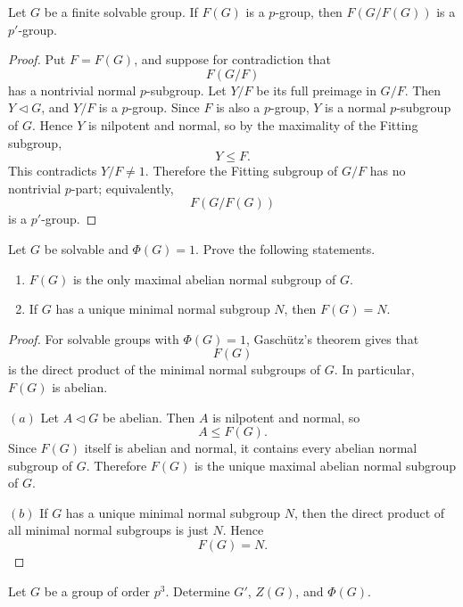 \begin{exercise}
Let \(G\) be a finite solvable group. If \(F(G)\) is a \(p\)-group, then
\(F(G/F(G))\) is a \(p'\)-group.
\end{exercise}

\begin{proof}
Put \(F=F(G)\), and suppose for contradiction that
\[
    F(G/F)
\]
has a nontrivial normal \(p\)-subgroup. Let \(Y/F\) be its full preimage in
\(G/F\). Then \(Y\lhd G\), and \(Y/F\) is a \(p\)-group. Since \(F\) is also a
\(p\)-group, \(Y\) is a normal \(p\)-subgroup of \(G\). Hence \(Y\) is nilpotent
and normal, so by the maximality of the Fitting subgroup,
\[
    Y\leq F.
\]
This contradicts \(Y/F\neq 1\). Therefore the Fitting subgroup of \(G/F\) has
no nontrivial \(p\)-part; equivalently,
\[
    F(G/F(G))
\]
is a \(p'\)-group.
\end{proof}

\begin{exercise}
Let \(G\) be solvable and \(\Phi(G) = 1\). Prove the following statements.
\begin{enumerate}[label=(\alph*)]
    \item \(F(G)\) is the only maximal abelian normal subgroup of \(G\).
    \item If \(G\) has a unique minimal normal subgroup \(N\), then
    \(F(G) = N\).
\end{enumerate}
\end{exercise}

\begin{proof}
For solvable groups with \(\Phi(G)=1\), Gasch\"utz's theorem gives that
\[
    F(G)
\]
is the direct product of the minimal normal subgroups of \(G\). In particular,
\(F(G)\) is abelian.

\((a)\) Let \(A\lhd G\) be abelian. Then \(A\) is nilpotent and normal, so
\[
    A\leq F(G).
\]
Since \(F(G)\) itself is abelian and normal, it contains every abelian normal
subgroup of \(G\). Therefore \(F(G)\) is the unique maximal abelian normal
subgroup of \(G\).

\((b)\) If \(G\) has a unique minimal normal subgroup \(N\), then the direct
product of all minimal normal subgroups is just \(N\). Hence
\[
    F(G)=N.
\]
\end{proof}

\begin{exercise}
Let \(G\) be a group of order \(p^3\). Determine \(G'\), \(Z(G)\), and
\(\Phi(G)\).
\end{exercise}

